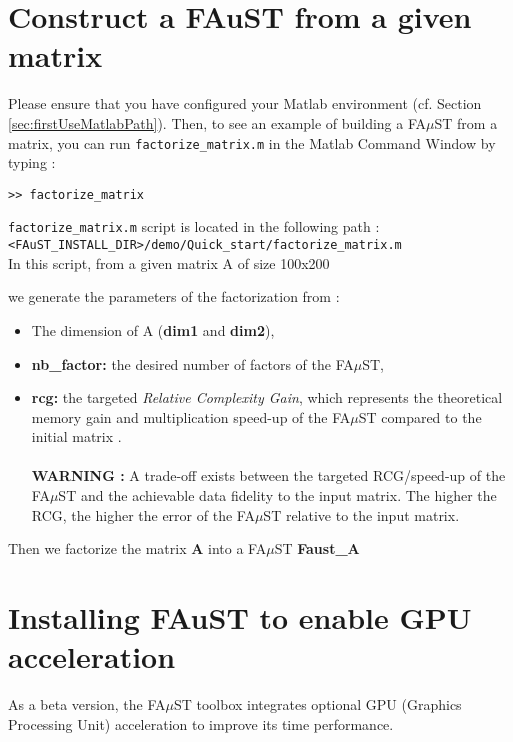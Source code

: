 \section{Construct a FAuST from a given matrix}\label{sec:WorkingProgressBuildFromMatrix}
Please ensure that you have configured your Matlab environment (cf. Section \ref{sec:firstUseMatlabPath}). Then, to see an example of building a FA$\mu$ST from a matrix, you can run \texttt{factorize\_matrix.m} in the Matlab Command Window by typing :
\lstset{style=customMatlab}
\begin{lstlisting}
>> factorize_matrix
\end{lstlisting}
\texttt{factorize\_matrix.m} script is located in the following path :\\
\texttt{<FAuST\_INSTALL\_DIR>/demo/Quick\_start/factorize\_matrix.m} \\

In this script, from a given matrix A of size 100x200 

we generate the parameters of the factorization from :
\begin{itemize}
\item The dimension of A (\textbf{dim1} and \textbf{dim2}),
\item \textbf{nb\_factor:} the desired number of factors of the FA$\mu$ST,
\item \textbf{rcg:} the targeted {\em Relative Complexity Gain}, which represents the theoretical memory gain and multiplication speed-up of the FA$\mu$ST compared to the initial matrix .
\\ \\\textbf{WARNING :}  A trade-off exists between the targeted RCG/speed-up of the FA$\mu$ST and the achievable data fidelity to the input matrix. The higher the RCG, the higher the error of the FA$\mu$ST relative to the input matrix.
\end{itemize}

\lstset{style=customBash}

Then we factorize the matrix \textbf{A} into a FA$\mu$ST \textbf{Faust\_A}



\section{Installing FAuST to enable GPU acceleration}\label{sec:OptionalGPU}
As a beta version, the FA$\mu$ST toolbox integrates optional GPU (Graphics Processing Unit) acceleration to improve its time performance.
